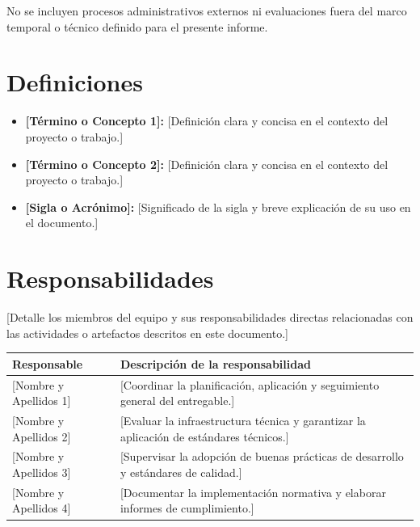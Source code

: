 \documentclass[10pt,letterpaper]{article}
\begin{document}
No se incluyen procesos administrativos externos ni evaluaciones fuera del marco temporal o técnico definido para el presente informe.

\section{Definiciones}

\begin{itemize}
    \item \textbf{[Término o Concepto 1]:} [Definición clara y concisa en el contexto del proyecto o trabajo.]
    \item \textbf{[Término o Concepto 2]:} [Definición clara y concisa en el contexto del proyecto o trabajo.]
    \item \textbf{[Sigla o Acrónimo]:} [Significado de la sigla y breve explicación de su uso en el documento.]
\end{itemize}

\section{Responsabilidades}

[Detalle los miembros del equipo y sus responsabilidades directas relacionadas con las actividades o artefactos descritos en este documento.]

\begin{center}
\renewcommand{\arraystretch}{1.2}
\begin{tabular}{lp{10.5cm}}
\toprule
\textbf{Responsable} & \textbf{Descripción de la responsabilidad} \\
\midrule
{[Nombre y Apellidos 1]} & [Coordinar la planificación, aplicación y seguimiento general del entregable.] \\
{[Nombre y Apellidos 2]} & [Evaluar la infraestructura técnica y garantizar la aplicación de estándares técnicos.] \\
{[Nombre y Apellidos 3]} & [Supervisar la adopción de buenas prácticas de desarrollo y estándares de calidad.] \\
{[Nombre y Apellidos 4]} & [Documentar la implementación normativa y elaborar informes de cumplimiento.] \\
\bottomrule
\end{tabular}
\end{center}
\end{document}
